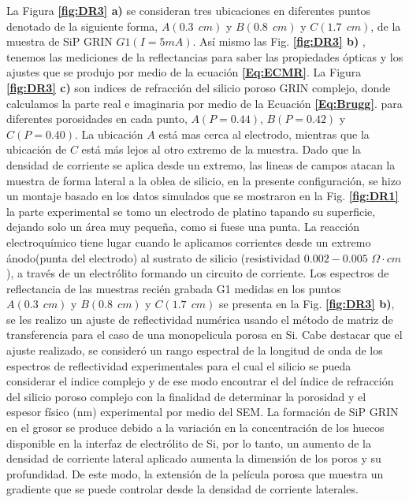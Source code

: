 \documentclass[a4paper,11pt,]{book}
\begin{document}
La  Figura \textbf{\ref{fig:DR3} a)} se consideran tres ubicaciones en diferentes puntos denotado de la siguiente forma,  $A(0.3\ \ cm)$ y $ B(0.8 \ \  cm)$ y $ C(1.7 \ \  cm)$, de la  muestra de SiP GRIN $G1(I=5 mA)$. Así mismo las Fig. \textbf{\ref{fig:DR3} b)} , tenemos las mediciones de la reflectancias para saber las propiedades ópticas y los ajustes que se produjo por medio de la ecuación \textbf{\ref{Eq:ECMR}}. La Figura \textbf{\ref{fig:DR3} c) } son indices de refracción del silicio poroso GRIN complejo, donde calculamos la parte real e imaginaria por medio de la Ecuación \textbf{\ref{Eq:Brugg}}. para diferentes porosidades en cada punto, $A(P=0.44)$, $B(P=0.42)$ y $C(P= 0.40)$. La ubicación $A$ está mas cerca al electrodo, mientras que la ubicación de $C$ está más lejos al otro extremo de la muestra. Dado que la densidad de corriente se aplica desde un extremo, las lineas de campos atacan la muestra de forma lateral a la oblea de silicio, en la presente configuración, se hizo un montaje  basado en los datos simulados que se mostraron en la Fig.\textbf{ \ref{fig:DR1}}  la parte experimental se tomo un electrodo de platino tapando su superficie, dejando solo un área muy pequeña, como si fuese  una punta. La reacción electroquímico tiene lugar cuando le aplicamos corrientes desde un extremo ánodo(punta del electrodo) al sustrato de silicio (resistividad $0.002 - 0.005$ $ \Omega \cdot cm$), a través de un electrólito formando un circuito de corriente. Los espectros de reflectancia de las muestras recién grabada G1  medidas en los puntos $A(0.3\ \ cm)$ y $ B(0.8 \ \  cm)$ y $ C(1.7 \ \  cm)$ se presenta en la Fig. \textbf{\ref{fig:DR3} b)}, se les realizo un ajuste de reflectividad numérica usando el método de matriz de transferencia para el caso de una monopelicula porosa en Si.  Cabe destacar que el ajuste realizado, se consideró un rango espectral de la longitud de onda de los espectros de reflectividad experimentales para el cual el silicio se pueda considerar el indice complejo y de ese modo encontrar el  del índice de refracción del silicio poroso complejo con la finalidad de determinar la porosidad  y el espesor físico (nm) experimental por medio del SEM. La formación de SiP GRIN en el grosor  se produce debido a la variación en la concentración de los huecos disponible en la interfaz de electrólito de Si, por lo tanto, un aumento de la densidad de corriente  lateral aplicado aumenta la dimensión de los poros y su profundidad. De este modo, la extensión de la película porosa que muestra un gradiente que  se puede controlar desde la densidad  de corriente laterales.
\end{document}
